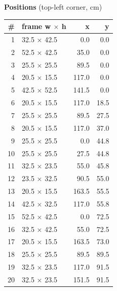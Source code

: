 \documentclass[a4paper,landscape,10pt]{article}
\begin{document}
\begin{minipage}[t]{0.25\textwidth}
\vspace{8pt}
{\bfseries Positions} (top-left corner, cm)\\[2pt]
\tiny
\begin{tabular}{@{}r l r r@{}}
\toprule
\# & frame w $\times$ h & x & y \\
\midrule
1 & 32.5 $\times$ 42.5 & 0.0 & 0.0 \\
2 & 52.5 $\times$ 42.5 & 35.0 & 0.0 \\
3 & 25.5 $\times$ 25.5 & 89.5 & 0.0 \\
4 & 20.5 $\times$ 15.5 & 117.0 & 0.0 \\
5 & 42.5 $\times$ 52.5 & 141.5 & 0.0 \\
6 & 20.5 $\times$ 15.5 & 117.0 & 18.5 \\
7 & 25.5 $\times$ 25.5 & 89.5 & 27.5 \\
8 & 20.5 $\times$ 15.5 & 117.0 & 37.0 \\
9 & 25.5 $\times$ 25.5 & 0.0 & 44.8 \\
10 & 25.5 $\times$ 25.5 & 27.5 & 44.8 \\
11 & 32.5 $\times$ 23.5 & 55.0 & 45.8 \\
12 & 23.5 $\times$ 32.5 & 90.5 & 55.0 \\
13 & 20.5 $\times$ 15.5 & 163.5 & 55.5 \\
14 & 42.5 $\times$ 32.5 & 117.0 & 55.8 \\
15 & 52.5 $\times$ 42.5 & 0.0 & 72.5 \\
16 & 32.5 $\times$ 42.5 & 55.0 & 72.5 \\
17 & 20.5 $\times$ 15.5 & 163.5 & 73.0 \\
18 & 25.5 $\times$ 25.5 & 89.5 & 89.5 \\
19 & 32.5 $\times$ 23.5 & 117.0 & 91.5 \\
20 & 32.5 $\times$ 23.5 & 151.5 & 91.5 \\
\bottomrule
\end{tabular}
\end{minipage}
\clearpage
\end{document}
